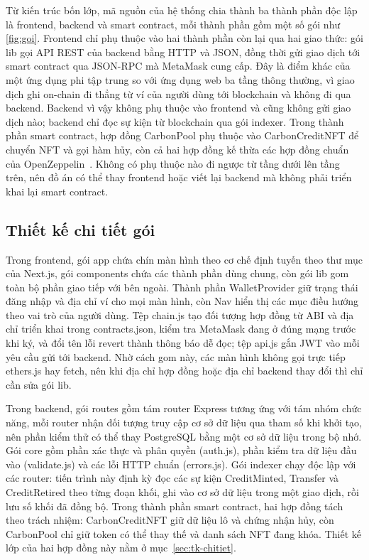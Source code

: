 Từ kiến trúc bốn lớp, mã nguồn của hệ thống chia thành ba thành phần độc lập là frontend, backend và smart contract, mỗi thành phần gồm một số gói như \autoref{fig:goi}. Frontend chỉ phụ thuộc vào hai thành phần còn lại qua hai giao thức: gói lib gọi API REST của backend bằng HTTP và JSON, đồng thời gửi giao dịch tới smart contract qua JSON-RPC mà MetaMask cung cấp. Đây là điểm khác của một ứng dụng phi tập trung so với ứng dụng web ba tầng thông thường, vì giao dịch ghi on-chain đi thẳng từ ví của người dùng tới blockchain và không đi qua backend. Backend vì vậy không phụ thuộc vào frontend và cũng không gửi giao dịch nào; backend chỉ đọc sự kiện từ blockchain qua gói indexer. Trong thành phần smart contract, hợp đồng CarbonPool phụ thuộc vào CarbonCreditNFT để chuyển NFT và gọi hàm hủy, còn cả hai hợp đồng kế thừa các hợp đồng chuẩn của OpenZeppelin~\cite{openzeppelin2024contracts}. Không có phụ thuộc nào đi ngược từ tầng dưới lên tầng trên, nên đồ án có thể thay frontend hoặc viết lại backend mà không phải triển khai lại smart contract.

\HinhGoi

\subsection*{Thiết kế chi tiết gói}
\label{subsec:tk-chitietgoi}

Trong frontend, gói app chứa chín màn hình theo cơ chế định tuyến theo thư mục của Next.js, gói components chứa các thành phần dùng chung, còn gói lib gom toàn bộ phần giao tiếp với bên ngoài. Thành phần WalletProvider giữ trạng thái đăng nhập và địa chỉ ví cho mọi màn hình, còn Nav hiển thị các mục điều hướng theo vai trò của người dùng. Tệp chain.js tạo đối tượng hợp đồng từ ABI và địa chỉ triển khai trong contracts.json, kiểm tra MetaMask đang ở đúng mạng trước khi ký, và đổi tên lỗi revert thành thông báo dễ đọc; tệp api.js gắn JWT vào mỗi yêu cầu gửi tới backend. Nhờ cách gom này, các màn hình không gọi trực tiếp ethers.js hay fetch, nên khi địa chỉ hợp đồng hoặc địa chỉ backend thay đổi thì chỉ cần sửa gói lib.

Trong backend, gói routes gồm tám router Express tương ứng với tám nhóm chức năng, mỗi router nhận đối tượng truy cập cơ sở dữ liệu qua tham số khi khởi tạo, nên phần kiểm thử có thể thay PostgreSQL bằng một cơ sở dữ liệu trong bộ nhớ. Gói core gồm phần xác thực và phân quyền (auth.js), phần kiểm tra dữ liệu đầu vào (validate.js) và các lỗi HTTP chuẩn (errors.js). Gói indexer chạy độc lập với các router: tiến trình này định kỳ đọc các sự kiện CreditMinted, Transfer và CreditRetired theo từng đoạn khối, ghi vào cơ sở dữ liệu trong một giao dịch, rồi lưu số khối đã đồng bộ. Trong thành phần smart contract, hai hợp đồng tách theo trách nhiệm: CarbonCreditNFT giữ dữ liệu lô và chứng nhận hủy, còn CarbonPool chỉ giữ token có thể thay thế và danh sách NFT đang khóa. Thiết kế lớp của hai hợp đồng này nằm ở mục~\ref{sec:tk-chitiet}.

